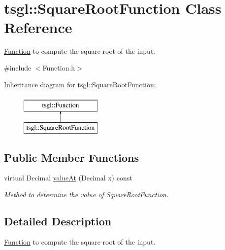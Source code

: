 \hypertarget{classtsgl_1_1_square_root_function}{\section{tsgl\-:\-:Square\-Root\-Function Class Reference}
\label{classtsgl_1_1_square_root_function}
}


\hyperlink{classtsgl_1_1_function}{Function} to compute the square root of the input.  




{\ttfamily \#include $<$Function.\-h$>$}

Inheritance diagram for tsgl\-:\-:Square\-Root\-Function\-:\begin{figure}[H]
\begin{center}
\leavevmode
\includegraphics[height=2.000000cm]{classtsgl_1_1_square_root_function}
\end{center}
\end{figure}
\subsection*{Public Member Functions}
\begin{DoxyCompactItemize}
\item 
virtual Decimal \hyperlink{classtsgl_1_1_square_root_function_a25f6192ef7b12b80c4a14186e1cde97c}{value\-At} (Decimal x) const 
\begin{DoxyCompactList}\small\item\em Method to determine the value of \hyperlink{classtsgl_1_1_square_root_function}{Square\-Root\-Function}. \end{DoxyCompactList}\end{DoxyCompactItemize}


\subsection{Detailed Description}
\hyperlink{classtsgl_1_1_function}{Function} to compute the square root of the input. 

